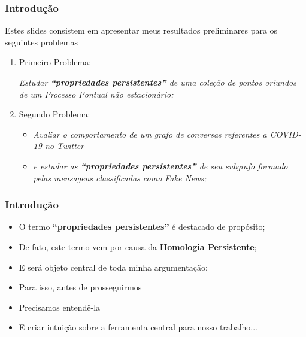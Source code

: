 \documentclass[11pt]{beamer}
\theoremstyle{remark}
\theoremstyle{definition}
\theoremstyle{plain}
\begin{document}
    \begin{frame}
        \frametitle{Introdução}

        Estes slides consistem em apresentar meus resultados
        preliminares para os seguintes problemas

        \begin{enumerate}
            \item Primeiro Problema:
            \begin{center}
                    \emph{
                        Estudar \textbf{``propriedades persistentes''} de uma
                        coleção de pontos oriundos de um Processo
                        Pontual não estacionário;
                    }
            \end{center}

        \item Segundo Problema:
            \begin{center}
                \begin{itemize}
                    \item
                        \emph{
                            Avaliar o comportamento de um grafo de conversas
                            referentes a COVID-19 no Twitter
                        }
                    \item
                        \emph{ e estudar as
                            \textbf{``propriedades persistentes''} de seu subgrafo formado
                            pelas mensagens classificadas como Fake News;
                        }
                \end{itemize}
            \end{center}
        \end{enumerate}
    \end{frame}

    \begin{frame}
        \frametitle{Introdução}
        \begin{itemize}
            \item
                O termo \textbf{``propriedades persistentes''} 
                é destacado de propósito;

            \item 
                De fato, este termo vem por causa da \textbf{Homologia
                Persistente};

            \item 
                E será objeto central de toda minha argumentação;

            \item Para isso, antes de prosseguirmos 

            \item Precisamos entendê-la

            \item E criar intuição sobre a ferramenta central para nosso
                trabalho...
        \end{itemize}
    \end{frame}
\end{document}
